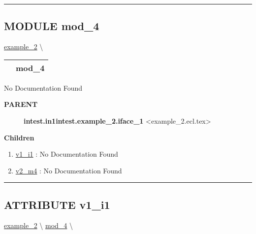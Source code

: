 \rule{\linewidth}{0.5pt}


\subsection*{\textsf{\colorbox{headtoc}{\color{white} MODULE}
mod\_4}}

\hypertarget{ecldoc:intest.in1intest.example_2.mod_4}{}
\hspace{0pt} \hyperlink{ecldoc:intest.in1intest.example_2}{example_2} \textbackslash 

{\renewcommand{\arraystretch}{1.5}
\begin{tabularx}{\textwidth}{|>{\raggedright\arraybackslash}l|X|}
\hline
\hspace{0pt}\mytexttt{\color{red} } & \textbf{mod\_4} \\
\hline
\end{tabularx}
}

\par





No Documentation Found










\par
\begin{description}
\item [\colorbox{tagtype}{\color{white} \textbf{\textsf{PARENT}}}] \textbf{intest.in1intest.example\_2.iface\_1} <example\_2.ecl.tex>
\end{description}


\textbf{Children}
\begin{enumerate}
\item \hyperlink{ecldoc:intest.in1intest.example_2.mod_4.v1_i1}{v1\_i1}
: No Documentation Found
\item \hyperlink{ecldoc:intest.in1intest.example_2.mod_4.v2_m4}{v2\_m4}
: No Documentation Found
\end{enumerate}

\rule{\linewidth}{0.5pt}

\subsection*{\textsf{\colorbox{headtoc}{\color{white} ATTRIBUTE}
v1\_i1}}

\hypertarget{ecldoc:intest.in1intest.example_2.mod_4.v1_i1}{}
\hspace{0pt} \hyperlink{ecldoc:intest.in1intest.example_2}{example_2} \textbackslash 
\hspace{0pt} \hyperlink{ecldoc:intest.in1intest.example_2.mod_4}{mod_4} \textbackslash 

